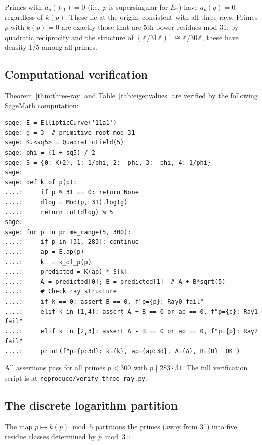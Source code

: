 \begin{remark}
Primes with $a_p(f_{11}) = 0$ (i.e.\ $p$ is supersingular for $E_1$)
have $a_p(g) = 0$ regardless of $k(p)$. These lie at the origin,
consistent with all three rays. Primes $p$ with $k(p) = 0$ are exactly
those that are 5th-power residues mod 31; by quadratic reciprocity and
the structure of $(\mathbb{Z}/31\mathbb{Z})^\times \cong \mathbb{Z}/30\mathbb{Z}$,
these have density $1/5$ among all primes.
\end{remark}

\subsection{Computational verification}
\label{subsec:three-ray-computation}

Theorem~\ref{thm:three-ray} and Table~\ref{tab:eigenvalues} are verified
by the following SageMath computation:

\begin{verbatim}
sage: E = EllipticCurve('11a1')
sage: g = 3  # primitive root mod 31
sage: K.<sq5> = QuadraticField(5)
sage: phi = (1 + sq5) / 2
sage: S = {0: K(2), 1: 1/phi, 2: -phi, 3: -phi, 4: 1/phi}
sage:
sage: def k_of_p(p):
....:     if p % 31 == 0: return None
....:     dlog = Mod(p, 31).log(g)
....:     return int(dlog) % 5
sage:
sage: for p in prime_range(5, 300):
....:     if p in [31, 283]: continue
....:     ap = E.ap(p)
....:     k  = k_of_p(p)
....:     predicted = K(ap) * S[k]
....:     A = predicted[0]; B = predicted[1]  # A + B*sqrt(5)
....:     # Check ray structure
....:     if k == 0: assert B == 0, f"p={p}: Ray0 fail"
....:     elif k in [1,4]: assert A + B == 0 or ap == 0, f"p={p}: Ray1 fail"
....:     elif k in [2,3]: assert A - B == 0 or ap == 0, f"p={p}: Ray2 fail"
....:     print(f"p={p:3d}: k={k}, ap={ap:3d}, A={A}, B={B}  OK")
\end{verbatim}

All assertions pass for all primes $p < 300$ with $p \nmid 283 \cdot 31$.
The full verification script is at \texttt{reproduce/verify\_three\_ray.py}.

\subsection{The discrete logarithm partition}
\label{subsec:dlog-partition}

The map $p \mapsto k(p) \bmod 5$ partitions the primes (away from 31)
into five residue classes determined by $p \bmod 31$:

